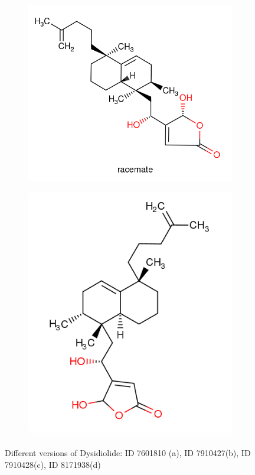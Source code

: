 \documentclass[a4paper,10pt,titlepage]{paper}
\begin{document}
\begin{figure}[H]
\begin{subfigure}{.5\textwidth}
  \caption{}
\end{subfigure}
\begin{subfigure}{.5\textwidth}
  \centering
  \vspace{0.4cm}
  \includegraphics[width=.8\linewidth]{Billeder/Dysidiolide-7910428-Close.png}
  \vspace{1.3cm}
  \caption{}
\end{subfigure}%
\begin{subfigure}{.5\textwidth}
  \centering
  \includegraphics[width=.8\linewidth]{Billeder/Dysidiolide-8171938-Close.png}
  \caption{}
\end{subfigure}
\caption{Different versions of Dysidiolide: ID 7601810 (a), ID 7910427(b), ID 7910428(c), ID 8171938(d)}
\label{fig::SameIDClose}
\end{figure}
\end{document}
